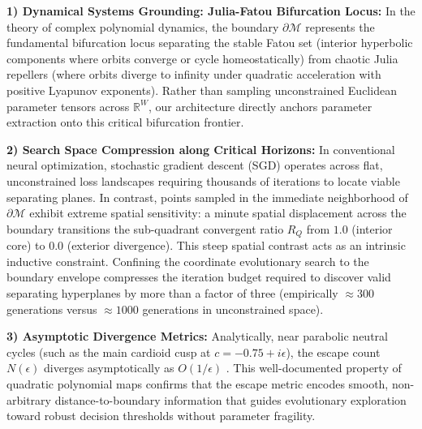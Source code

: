 \documentclass[10pt,journal,compsoc,twocolumn]{article}
\begin{document}
\textbf{1) Dynamical Systems Grounding: Julia-Fatou Bifurcation Locus:} In the theory of complex polynomial dynamics, the boundary $\partial \mathcal{M}$ represents the fundamental bifurcation locus separating the stable Fatou set (interior hyperbolic components where orbits converge or cycle homeostatically) from chaotic Julia repellers (where orbits diverge to infinity under quadratic acceleration with positive Lyapunov exponents). Rather than sampling unconstrained Euclidean parameter tensors across $\mathbb{R}^W$, our architecture directly anchors parameter extraction onto this critical bifurcation frontier.

\textbf{2) Search Space Compression along Critical Horizons:} In conventional neural optimization, stochastic gradient descent (SGD) operates across flat, unconstrained loss landscapes requiring thousands of iterations to locate viable separating planes. In contrast, points sampled in the immediate neighborhood of $\partial \mathcal{M}$ exhibit extreme spatial sensitivity: a minute spatial displacement across the boundary transitions the sub-quadrant convergent ratio $R_Q$ from $1.0$ (interior core) to $0.0$ (exterior divergence). This steep spatial contrast acts as an intrinsic inductive constraint. Confining the coordinate evolutionary search to the boundary envelope compresses the iteration budget required to discover valid separating hyperplanes by more than a factor of three (empirically $\approx 300$ generations versus $\approx 1000$ generations in unconstrained space).

\textbf{3) Asymptotic Divergence Metrics:} Analytically, near parabolic neutral cycles (such as the main cardioid cusp at $c = -0.75 + i\epsilon$), the escape count $N(\epsilon)$ diverges asymptotically as $O(1/\epsilon)$ \cite{peitgen1992chaos}. This well-documented property of quadratic polynomial maps confirms that the escape metric encodes smooth, non-arbitrary distance-to-boundary information that guides evolutionary exploration toward robust decision thresholds without parameter fragility.
\end{document}
